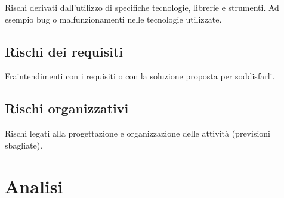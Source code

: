 \documentclass[12pt,a4paper]{article}
\begin{document}
Rischi derivati dall'utilizzo di specifiche tecnologie, librerie e strumenti. Ad esempio bug o malfunzionamenti nelle tecnologie utilizzate.

\subsection{Rischi dei requisiti}

Fraintendimenti con i requisiti o con la soluzione proposta per soddisfarli.

\subsection{Rischi organizzativi}

Rischi legati alla progettazione e organizzazione delle attività (previsioni sbagliate).

\newpage

\section{Analisi}
\end{document}
